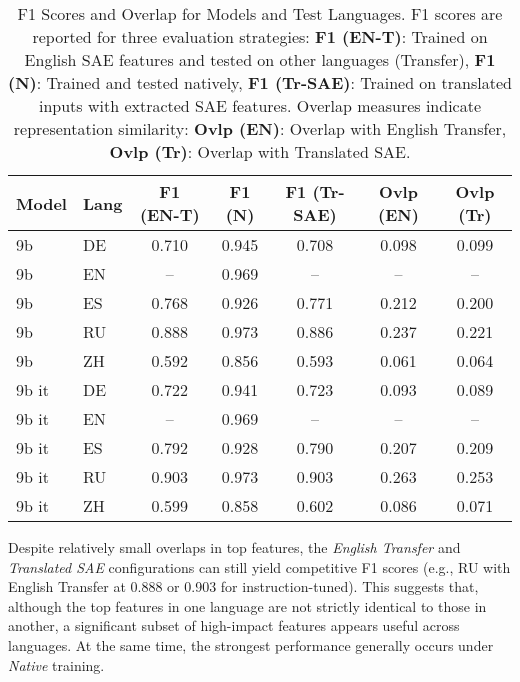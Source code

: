\begin{table*}[ht]
    \centering
    \caption{F1 Scores and Overlap for Models and Test Languages. 
    F1 scores are reported for three evaluation strategies: 
    \textbf{F1 (EN-T)}: Trained on English SAE features and tested on other languages (Transfer), 
    \textbf{F1 (N)}: Trained and tested natively, 
    \textbf{F1 (Tr-SAE)}: Trained on translated inputs with extracted SAE features. 
    Overlap measures indicate representation similarity: 
    \textbf{Ovlp (EN)}: Overlap with English Transfer, 
    \textbf{Ovlp (Tr)}: Overlap with Translated SAE.}
    \label{tab:scores_overlap}
    \begin{tabular}{llccc cc}
        \toprule
        \textbf{Model} & \textbf{Lang} & \textbf{F1 (EN-T)} & \textbf{F1 (N)} & \textbf{F1 (Tr-SAE)} & \textbf{Ovlp (EN)} & \textbf{Ovlp (Tr)} \\
        \midrule
        9b    & DE  & 0.710 & 0.945 & 0.708 & 0.098 & 0.099 \\
        9b    & EN  & --    & 0.969 & --    & --    & --    \\
        9b    & ES  & 0.768 & 0.926 & 0.771 & 0.212 & 0.200 \\
        9b    & RU  & 0.888 & 0.973 & 0.886 & 0.237 & 0.221 \\
        9b    & ZH  & 0.592 & 0.856 & 0.593 & 0.061 & 0.064 \\
        \cmidrule(lr){1-7}
        9b it & DE  & 0.722 & 0.941 & 0.723 & 0.093 & 0.089 \\
        9b it & EN  & --    & 0.969 & --    & --    & --    \\
        9b it & ES  & 0.792 & 0.928 & 0.790 & 0.207 & 0.209 \\
        9b it & RU  & 0.903 & 0.973 & 0.903 & 0.263 & 0.253 \\
        9b it & ZH  & 0.599 & 0.858 & 0.602 & 0.086 & 0.071 \\
        \bottomrule
    \end{tabular}
\end{table*}



Despite relatively small overlaps in top features, the \emph{English Transfer} and \emph{Translated SAE} configurations can still yield competitive F1 scores (e.g., RU with English Transfer at 0.888 or 0.903 for instruction-tuned). This suggests that, although the top features in one language are not strictly identical to those in another, a significant subset of high-impact features appears useful across languages. At the same time, the strongest performance generally occurs under \emph{Native} training.


